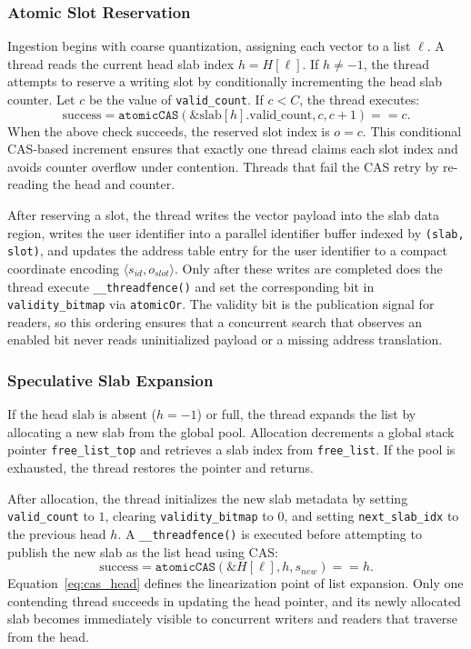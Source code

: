 \documentclass[sigconf,nonacm]{acmart}
\theoremstyle{plain}
\theoremstyle{definition}
\theoremstyle{remark}
\begin{document}
\subsubsection{Atomic Slot Reservation}
\label{sub:atomic_reservation}

Ingestion begins with coarse quantization, assigning each vector to a list $\ell$. A thread reads the current head slab index $h = H[\ell]$. If $h \neq -1$, the thread attempts to reserve a writing slot by conditionally incrementing the head slab counter. Let $c$ be the value of \texttt{valid\_count}. If $c < C$, the thread executes:
\begin{equation}
\label{eq:cas_count}
\text{success} =
\texttt{atomicCAS}(\&\text{slab}[h].\text{valid\_count}, c, c+1) == c .
\end{equation}
When the above check succeeds, the reserved slot index is $o=c$. This conditional CAS-based increment ensures that exactly one thread claims each slot index and avoids counter overflow under contention. Threads that fail the CAS retry by re-reading the head and counter.

After reserving a slot, the thread writes the vector payload into the slab data region, writes the user identifier into a parallel identifier buffer indexed by \texttt{(slab, slot)}, and updates the address table entry for the user identifier to a compact coordinate encoding $\langle s_{id}, o_{slot} \rangle$. Only after these writes are completed does the thread execute \verb|__threadfence()| and set the corresponding bit in \texttt{validity\_bitmap} via \texttt{atomicOr}. The validity bit is the publication signal for readers, so this ordering ensures that a concurrent search that observes an enabled bit never reads uninitialized payload or a missing address translation.

\subsubsection{Speculative Slab Expansion}
\label{sub:dynamic_expansion}

If the head slab is absent ($h=-1$) or full, the thread expands the list by allocating a new slab from the global pool. Allocation decrements a global stack pointer \texttt{free\_list\_top} and retrieves a slab index from \texttt{free\_list}. If the pool is exhausted, the thread restores the pointer and returns.

After allocation, the thread initializes the new slab metadata by setting \texttt{valid\_count} to $1$, clearing \texttt{validity\_bitmap} to $0$, and setting \texttt{next\_slab\_idx} to the previous head $h$. A \verb|__threadfence()| is executed before attempting to publish the new slab as the list head using CAS:
\begin{equation}
\label{eq:cas_head}
\text{success} = \texttt{atomicCAS}(\&H[\ell], h, s_{new}) == h .
\end{equation}
Equation~\ref{eq:cas_head} defines the linearization point of list expansion. Only one contending thread succeeds in updating the head pointer, and its newly allocated slab becomes immediately visible to concurrent writers and readers that traverse from the head.
\end{document}

